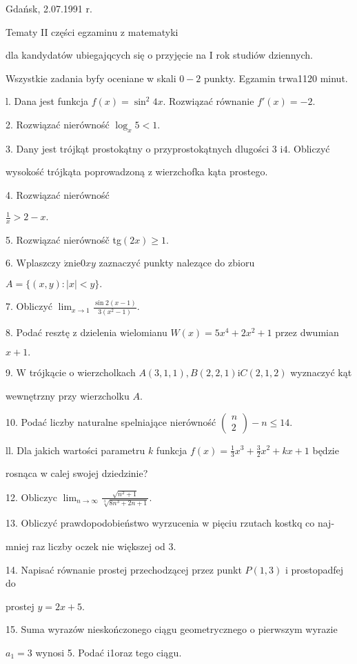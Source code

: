 \documentclass[a4paper,12pt]{article}
\begin{document}
Gdańsk, 2.07.1991 r.

Tematy II części egzaminu z matematyki

dla kandydatów ubiegajqcych się o przyjęcie na I rok studiów dziennych.

Wszystkie zadania byfy oceniane w skali $0-2$ punkty. Egzamin trwa1120 minut.

l. Dana jest funkcja $f(x)=\sin^{2}4x$. Rozwiązać równanie $f'(x)=-2.$

2. Rozwiązać nierówność $\log_{x}5<1.$

3. Dany jest trójkąt prostokątny o przyprostokątnych dlugości 3 $\mathrm{i}4$. Obliczyć

wysokość trójkąta poprowadzoną z wierzchofka kąta prostego.

4. Rozwiązać nierówność

$\displaystyle \frac{1}{x}>2-x.$

5. Rozwiązać nierównośč tg$(2x)\geq 1.$

6. $\mathrm{W}\mathrm{p}$laszczy $\acute{\mathrm{z}}\mathrm{n}\mathrm{i}\mathrm{e}0xy$ zaznaczyć punkty nalezące do zbioru

$A=\{(x,y):|x|<y\}.$

7. Obliczyć $\displaystyle \lim_{x\rightarrow 1}\frac{\sin 2(x-1)}{3(x^{2}-1)}.$

8. Podać resztę z dzielenia wielomianu $W(x) = 5x^{4}+2x^{2}+1$ przez dwumian

$x+1.$

9. $\mathrm{W}$ trójkącie o wierzcholkach $A(3,1,1), B(2,2,1) \mathrm{i}C(2,1,2)$ wyznaczyć kąt

wewnętrzny przy wierzcholku $A.$

10. Podać liczby naturalne spelniające nierówność $\left(\begin{array}{l}
n\\
2
\end{array}\right) -n\leq 14.$

ll. Dla jakich wartości parametru $k$ funkcja $f(x) = \displaystyle \frac{1}{3}x^{3}+\frac{3}{2}x^{2}+kx+1$ będzie

rosnąca w calej swojej dziedzinie?

12. Obliczyc $\displaystyle \lim_{n\rightarrow\infty}\frac{\sqrt{n^{2}+1}}{\sqrt[3]{8n^{3}+2n+1}}.$

13. Obliczyć prawdopodobieństwo wyrzucenia w pięciu rzutach kostkq co naj-

mniej raz liczby oczek nie większej od 3.

14. Napisać równanie prostej przechodzącej przez punkt $P(1,3)$ i prostopadfej do

prostej $y=2x+5.$

15. Suma wyrazów nieskończonego ciągu geometrycznego o pierwszym wyrazie

$a_{1}=3$ wynosi 5. Podać i1oraz tego ciągu.
\end{document}
